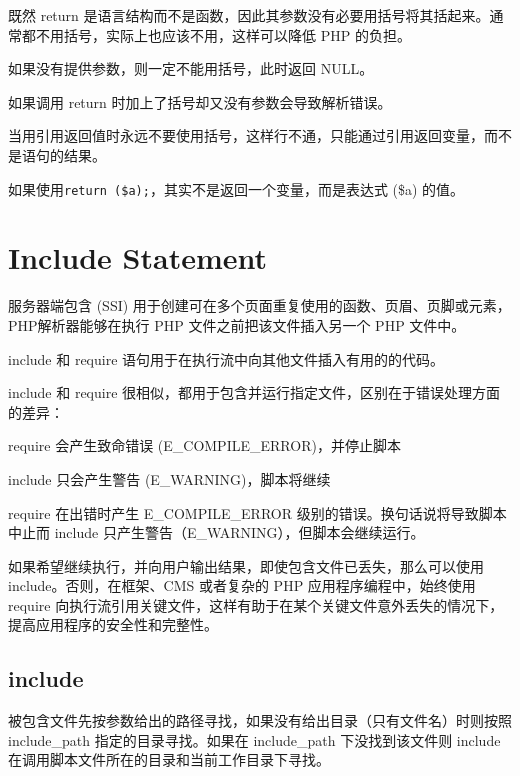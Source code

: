 既然 return 是语言结构而不是函数，因此其参数没有必要用括号将其括起来。通常都不用括号，实际上也应该不用，这样可以降低 PHP 的负担。


\begin{compactitem}
\item 如果没有提供参数，则一定不能用括号，此时返回 NULL。
\item 如果调用 return 时加上了括号却又没有参数会导致解析错误。
\end{compactitem}


当用引用返回值时永远不要使用括号，这样行不通，只能通过引用返回变量，而不是语句的结果。

如果使用\texttt{return (\$a);}，其实不是返回一个变量，而是表达式 (\$a) 的值。

\section{Include Statement}


服务器端包含 (SSI) 用于创建可在多个页面重复使用的函数、页眉、页脚或元素，PHP解析器能够在执行 PHP 文件之前把该文件插入另一个 PHP 文件中。

include 和 require 语句用于在执行流中向其他文件插入有用的的代码。

include 和 require 很相似，都用于包含并运行指定文件，区别在于错误处理方面的差异：

\begin{compactitem}
\item require 会产生致命错误 (E\_COMPILE\_ERROR)，并停止脚本
\item include 只会产生警告 (E\_WARNING)，脚本将继续
\end{compactitem}

require 在出错时产生 E\_COMPILE\_ERROR 级别的错误。换句话说将导致脚本中止而 include 只产生警告（E\_WARNING），但脚本会继续运行。

如果希望继续执行，并向用户输出结果，即使包含文件已丢失，那么可以使用 include。否则，在框架、CMS 或者复杂的 PHP 应用程序编程中，始终使用 require 向执行流引用关键文件，这样有助于在某个关键文件意外丢失的情况下，提高应用程序的安全性和完整性。


\subsection{include}

被包含文件先按参数给出的路径寻找，如果没有给出目录（只有文件名）时则按照 include\_path 指定的目录寻找。如果在 include\_path 下没找到该文件则 include 在调用脚本文件所在的目录和当前工作目录下寻找。

